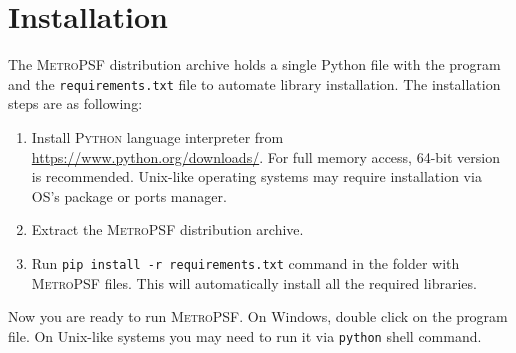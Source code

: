 \documentclass{article}
\begin{document}
\section{Installation} \label{installation}
The \textsc{MetroPSF} distribution archive holds a single Python file with the program and the \texttt{requirements.txt} file to automate library installation. The installation steps are as following:

\begin{enumerate}
\item Install \textsc{Python} language interpreter from \url{https://www.python.org/downloads/}. For full memory access, 64-bit version is recommended. Unix-like operating systems may require installation via OS's package or ports manager. 
\item Extract the \textsc{MetroPSF} distribution archive.
\item Run \texttt{pip install -r requirements.txt} command in the folder with \textsc{MetroPSF} files. This will automatically install all the required libraries. 
\end{enumerate}
Now you are ready to run \textsc{MetroPSF}. On Windows, double click on the program file. On Unix-like systems you may need to run it via \texttt{python} shell command. 
\end{document}
